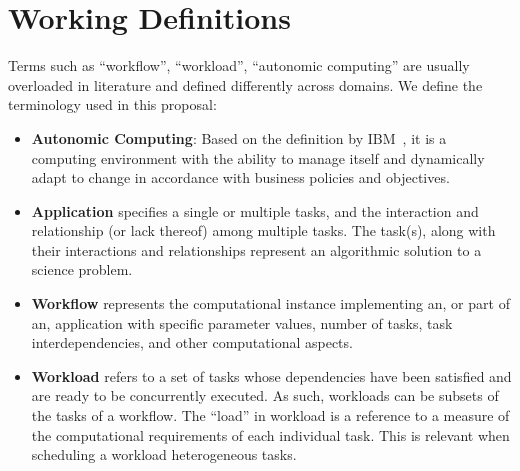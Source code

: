 %
%
%

\section{Working Definitions}
Terms such as ``workflow'', ``workload'', ``autonomic computing'' are usually 
overloaded in literature and defined differently across domains. We define the 
terminology used in this proposal:
\begin{itemize}
    \item \textbf{Autonomic Computing}: Based on the definition by IBM~\cite{ibm2005autonomic}, 
    it is a computing environment with the ability to manage itself and dynamically 
    adapt to change in accordance with business policies and objectives.
    \item \textbf{Application} specifies a single or multiple tasks, and the 
    interaction and relationship (or lack thereof) among multiple tasks. The task(s), 
    along with their interactions and relationships represent an algorithmic solution 
    to a science problem.
    \item \textbf{Workflow} represents the computational instance implementing an, or 
    part of an, application with specific parameter values, number of tasks, task 
    interdependencies, and other computational aspects.
    \item \textbf{Workload} refers to a set of tasks whose dependencies have been satisfied 
    and are ready to be concurrently executed. As such, workloads can be subsets of the 
    tasks of a workflow. The “load” in workload is a reference to a measure of the computational 
    requirements of each individual task. This is relevant when scheduling a workload 
    heterogeneous tasks.
\end{itemize}

